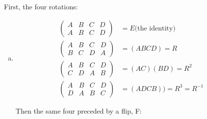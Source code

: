 \documentclass[11pt,oneside]{article}
\numberwithin{equation}{section}
\theoremstyle{definition}
\begin{document}
\begin{solution}
  First, the four rotations: 
  \begin{enumerate}[(a)]
  \item
    \begin{align*}
    \begin{pmatrix}
      A & B & C & D \\ 
      A & B & C & D
    \end{pmatrix} & = E \text{(the identity)} & \\
    \begin{pmatrix}
      A & B & C & D \\ 
      B & C & D & A 
    \end{pmatrix} & = (A B C D) = R & \\
    \begin{pmatrix}
      A & B & C & D \\ 
      C & D & A & B
    \end{pmatrix} & = (A C)(B D) = R^2 & \\
    \begin{pmatrix}
      A & B & C & D \\ 
      D & A & B & C
    \end{pmatrix} & = (A D C B))  = R ^ 3 = R ^ {-1} &
    \end{align*}
    
    Then the same four preceded by a flip, F:


\end{enumerate}
\end{solution}
\end{document}

